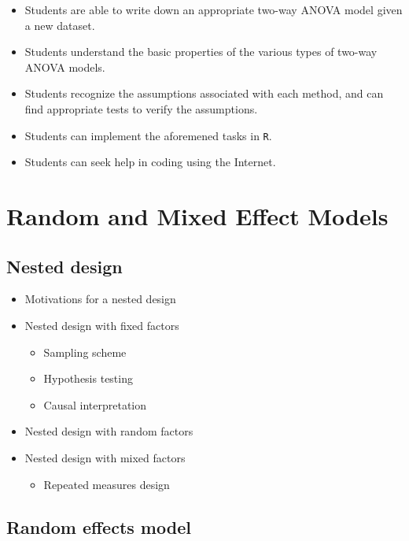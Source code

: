 \documentclass[12pt,]{book}
\providecommand{\tightlist}{%
  \setlength{\itemsep}{0pt}\setlength{\parskip}{0pt}}
\begin{document}
\begin{itemize}
\tightlist
\item
  Students are able to write down an appropriate two-way ANOVA model
  given a new dataset.
\item
  Students understand the basic properties of the various types of
  two-way ANOVA models.
\item
  Students recognize the assumptions associated with each method, and
  can find appropriate tests to verify the assumptions.
\item
  Students can implement the aforemened tasks in \texttt{R}.
\item
  Students can seek help in coding using the Internet.
\end{itemize}

\chapter{Random and Mixed Effect Models}\label{ch:nested}

\section{Nested design}\label{nested-design}

\begin{itemize}
\tightlist
\item
  Motivations for a nested design
\item
  Nested design with fixed factors

  \begin{itemize}
  \tightlist
  \item
    Sampling scheme
  \item
    Hypothesis testing
  \item
    Causal interpretation
  \end{itemize}
\item
  Nested design with random factors
\item
  Nested design with mixed factors

  \begin{itemize}
  \tightlist
  \item
    Repeated measures design
  \end{itemize}
\end{itemize}

\section{Random effects model}\label{random-effects-model}
\end{document}
